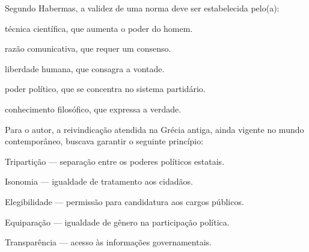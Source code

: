 \questao
{}
Segundo Habermas, a validez de uma norma deve ser estabelecida pelo(a):
\begin{alternativas}
\item técnica científica, que aumenta o poder do homem.
\item razão comunicativa, que requer um consenso.
\item liberdade humana, que consagra a vontade.
\item poder político, que se concentra no sistema partidário.
\item conhecimento filosófico, que expressa a verdade.
\end{alternativas}

\questao
{}
Para o autor, a reivindicação atendida na Grécia antiga, ainda vigente no mundo contemporâneo, buscava garantir o seguinte princípio:
\begin{alternativas}
\item Tripartição — separação entre os poderes políticos estatais.
\item Isonomia — igualdade de tratamento aos cidadãos.
\item Elegibilidade — permissão para candidatura aos cargos públicos.
\item Equiparação — igualdade de gênero na participação política.
\item Transparência — acesso às informações governamentais.
\end{alternativas}

